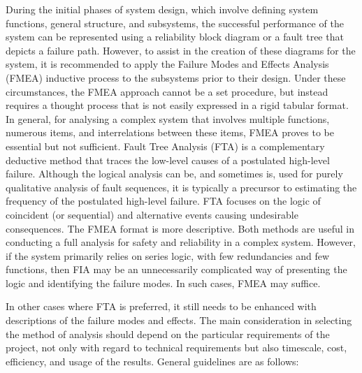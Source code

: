 \documentclass[./dissertation.tex]{subfiles}
\begin{document}
During the initial phases of system design, which involve defining system functions, general structure, and subsystems, the successful performance of the system can be represented using a reliability block diagram or a fault tree that depicts a failure path. However, to assist in the creation of these diagrams for the system, it is recommended to apply the Failure Modes and Effects Analysis (FMEA) inductive process to the subsystems prior to their design. Under these circumstances, the FMEA approach cannot be a set procedure, but instead requires a thought process that is not easily expressed in a rigid tabular format. In general, for analysing a complex system that involves multiple functions, numerous items, and interrelations between these items, FMEA proves to be essential but not sufficient. Fault Tree Analysis (FTA) is a complementary deductive method that traces the low-level causes of a postulated high-level failure. Although the logical analysis can be, and sometimes is, used for purely qualitative analysis of fault sequences, it is typically a precursor to estimating the frequency of the postulated high-level failure. FTA focuses on the logic of coincident (or sequential) and alternative events causing undesirable consequences. The FMEA format is more descriptive. Both methods are useful in conducting a full analysis for safety and reliability in a complex system. However, if the system primarily relies on series logic, with few redundancies and few functions, then FIA may be an unnecessarily complicated way of presenting the logic and identifying the failure modes. In such cases, FMEA may suffice.

In other cases where FTA is preferred, it still needs to be enhanced with descriptions of the failure modes and effects. The main consideration in selecting the method of analysis should depend on the particular requirements of the project, not only with regard to technical requirements but also timescale, cost, efficiency, and usage of the results. General guidelines are as follows:
\end{document}
